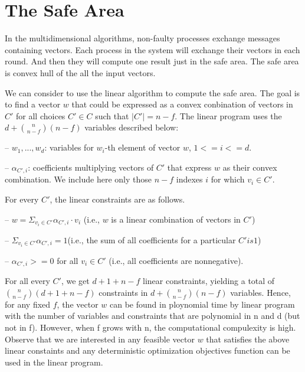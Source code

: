 \section{The Safe Area}
In the multidimensional algorithms, non-faulty processes exchange messages
containing vectors. Each process in the system will exchange their vectors
in each round. And then they will compute one result just in the safe area.
The safe area is convex hull of the all the input vectors\cite{perles2007generalization}.

We can consider to use the linear algorithm to compute the safe area.
The goal is to find a vector $w$ that could be expressed as a convex conbination
of vectors in $C\prime$ for all choices $C\prime \in C$ such that $|C\prime| = n - f$. 
The linear program uses the $d + \binom{n}{n - f}(n - f)$ variables described below:


-- $w_1, ..., w_{d}$: variables for $w_{i}$-th element of vector $w$, $1 <= i <= d$.

-- $\alpha_{C\prime, i}$: coefficients multiplying vectors of $C\prime$ that express $w$
as their convex combination. We include here only those $n - f$ indexes $i$ for which $v_{i} \in C\prime$.

For every $C\prime$, the linear constraints are as follows.

-- $w = \Sigma_{v_{i} \in C\prime}\alpha_{C\prime, i} \cdot v_{i}$ (i.e., $w$ is a linear combination of vectors in $C\prime$)

-- $\Sigma_{v_{i} \in C\prime}\alpha_{C\prime, i} = 1$(i.e., the sum of all coefficients for a particular $C\prime is 1$)

-- $\alpha_{C\prime, i} >= 0$ for all $v_{i} \in C\prime$ (i.e., all coefficients are nonnegative).

For all every $C\prime$, we get $d + 1 + n - f$ linear constraints, yielding a total of 
$\binom{n}{n - f}(d + 1 + n - f)$ constraints in $d + \binom{n}{n - f}(n - f)$ variables. 
Hence, for any fixed $f$, the vector $w$ can be found in ploynomial time by linear program
with the number of variables and constraints that are polynomial in n and d (but not in f).
However, when f grows with n, the computational compulexity is high. Observe that we are
interested in any feasible vector $w$ that satisfies the above linear constaints and any
deterministic optimization objectives function can be used in the linear program.
